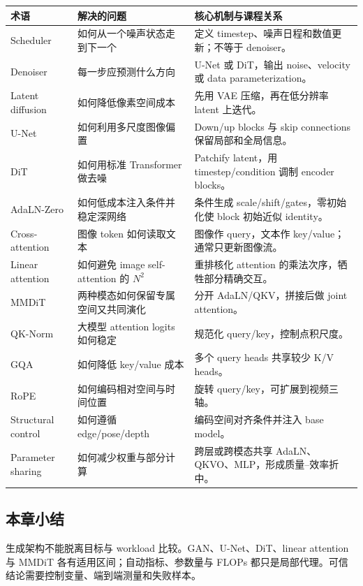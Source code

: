 \documentclass[a4paper]{article}
\begin{document}
\begin{center}
\small
\begin{tabularx}{\textwidth}{p{} X X}
\toprule
\textbf{术语} & \textbf{解决的问题} & \textbf{核心机制与课程关系} \\
\midrule
Scheduler & 如何从一个噪声状态走到下一个 & 定义 timestep、噪声日程和数值更新；不等于 denoiser。 \\
Denoiser & 每一步应预测什么方向 & U-Net 或 DiT，输出 noise、velocity 或 data parameterization。 \\
Latent diffusion & 如何降低像素空间成本 & 先用 VAE 压缩，再在低分辨率 latent 上迭代。 \\
U-Net & 如何利用多尺度图像偏置 & Down/up blocks 与 skip connections 保留局部和全局信息。 \\
DiT & 如何用标准 Transformer 做去噪 & Patchify latent，用 timestep/condition 调制 encoder blocks。 \\
AdaLN-Zero & 如何低成本注入条件并稳定深网络 & 条件生成 scale/shift/gates，零初始化使 block 初始近似 identity。 \\
Cross-attention & 图像 token 如何读取文本 & 图像作 query，文本作 key/value；通常只更新图像流。 \\
Linear attention & 如何避免 image self-attention 的 $N^2$ & 重排核化 attention 的乘法次序，牺牲部分精确交互。 \\
MMDiT & 两种模态如何保留专属空间又共同演化 & 分开 AdaLN/QKV，拼接后做 joint attention。 \\
QK-Norm & 大模型 attention logits 如何稳定 & 规范化 query/key，控制点积尺度。 \\
GQA & 如何降低 key/value 成本 & 多个 query heads 共享较少 K/V heads。 \\
RoPE & 如何编码相对空间与时间位置 & 旋转 query/key，可扩展到视频三轴。 \\
Structural control & 如何遵循 edge/pose/depth & 编码空间对齐条件并注入 base model。 \\
Parameter sharing & 如何减少权重与部分计算 & 跨层或跨模态共享 AdaLN、QKVO、MLP，形成质量--效率折中。 \\
\bottomrule
\end{tabularx}
\end{center}

\subsection{本章小结}

生成架构不能脱离目标与 workload 比较。GAN、U-Net、DiT、linear attention 与 MMDiT 各有适用区间；自动指标、参数量与 FLOPs 都只是局部代理。可信结论需要控制变量、端到端测量和失败样本。
\end{document}
